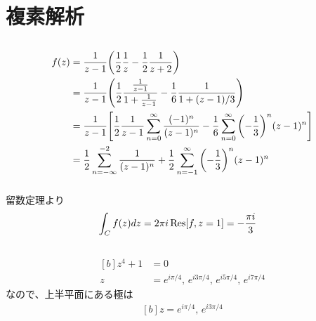 \documentclass[../ap_2013.tex]{subfiles}
\begin{document}
\setcounter{chapter}{2}
\chapter{複素解析}
\section{}
\subsection{}
\begin{equation}\begin{aligned}[b]
    f(z) &= \frac{1}{z-1}\qty(\frac{1}{2}\frac{1}{z}-\frac{1}{2}\frac{1}{z+2})\\
     &= \frac{1}{z-1}\qty(\frac{1}{2}\frac{\frac{1}{z-1}}{1+\frac{1}{z-1}}-\frac{1}{6}\frac{1}{1+(z-1)/3})\\
     &= \frac{1}{z-1}\qty[\frac{1}{2}\frac{1}{z-1}\sum_{n=0}^{\infty}\frac{(-1)^n}{(z-1)^n}-\frac{1}{6}\sum_{n=0}^{\infty}\qty(-\frac{1}{3})^n(z-1)^n]\\
     &= \frac{1}{2}\sum_{n=-\infty}^{-2}\frac{1}{(z-1)^n}+\frac{1}{2}\sum_{n=-1}^{\infty}\qty(-\frac{1}{3})^n(z-1)^n
\end{aligned}\end{equation}

\subsection{}
留数定理より
\begin{equation}\begin{aligned}[b]
    \int_C f(z)dz &= 2\pi i \Res[f,z=1] = -\frac{\pi i}{3}
\end{aligned}\end{equation}

\section{}
\subsection{}
\begin{equation}\begin{aligned}[b]
    z^4+1&=0\\
    z &= e^{i\pi/4},\,e^{i3\pi/4},\,e^{i5\pi/4},\,e^{i7\pi/4}
\end{aligned}\end{equation}
なので、上半平面にある極は
\begin{equation}\begin{aligned}[b]
    z =e^{i\pi/4},\,e^{i3\pi/4}
\end{aligned}\end{equation}
\end{document}
